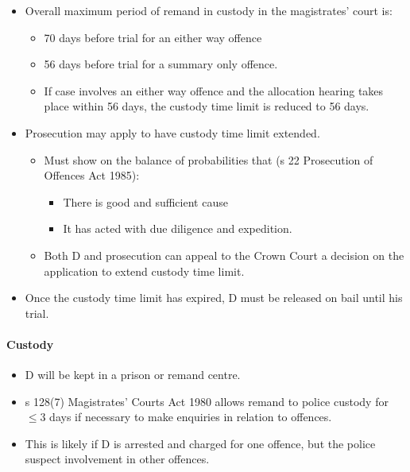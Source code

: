 \documentclass[
]{article}
\providecommand{\tightlist}{%
  \setlength{\itemsep}{0pt}\setlength{\parskip}{0pt}}
\begin{document}
\begin{itemize}
\tightlist
\item
  Overall maximum period of remand in custody in the magistrates' court
  is:

  \begin{itemize}
  \tightlist
  \item
    70 days before trial for an either way offence
  \item
    56 days before trial for a summary only offence.
  \item
    If case involves an either way offence and the allocation hearing
    takes place within 56 days, the custody time limit is reduced to 56
    days.
  \end{itemize}
\item
  Prosecution may apply to have custody time limit extended.

  \begin{itemize}
  \tightlist
  \item
    Must show on the balance of probabilities that (s 22 Prosecution of
    Offences Act 1985):

    \begin{itemize}
    \tightlist
    \item
      There is good and sufficient cause
    \item
      It has acted with due diligence and expedition.
    \end{itemize}
  \item
    Both D and prosecution can appeal to the Crown Court a decision on
    the application to extend custody time limit.
  \end{itemize}
\item
  Once the custody time limit has expired, D must be released on bail
  until his trial.
\end{itemize}

\hypertarget{custody}{%
\paragraph{Custody}\label{custody}}

\begin{itemize}
\tightlist
\item
  D will be kept in a prison or remand centre.
\item
  s 128(7) Magistrates' Courts Act 1980 allows remand to police custody
  for \(\leq 3\) days if necessary to make enquiries in relation to
  offences.
\item
  This is likely if D is arrested and charged for one offence, but the
  police suspect involvement in other offences.
\end{itemize}
\end{document}
